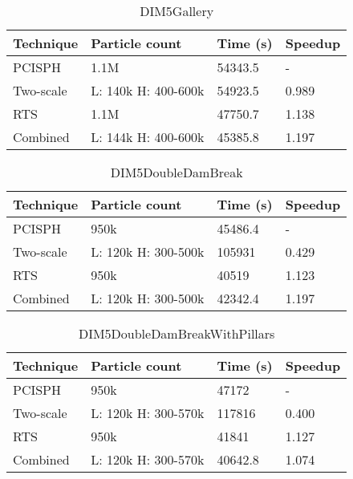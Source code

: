 \documentclass[../../main.tex]{subfiles}
\begin{document}

\begin{table}[]
\centering
\caption{DIM5Gallery}
\label{my-label}
\begin{tabular}{llll}
\hline
Technique & Particle count      & Time (s) & Speedup \\ \hline
PCISPH    & 1.1M                & 54343.5  & -       \\
Two-scale & L: 140k H: 400-600k & 54923.5  & 0.989   \\
RTS       & 1.1M                & 47750.7  & 1.138   \\
Combined  & L: 144k H: 400-600k & 45385.8  & 1.197   \\ \hline
\end{tabular}
\end{table}

\begin{table}[]
\centering
\caption{DIM5DoubleDamBreak}
\label{my-label}
\begin{tabular}{llll}
\hline
Technique & Particle count      & Time (s) & Speedup \\ \hline
PCISPH    & 950k                & 45486.4  & -       \\
Two-scale & L: 120k H: 300-500k & 105931   & 0.429   \\
RTS       & 950k                & 40519    & 1.123   \\
Combined  & L: 120k H: 300-500k & 42342.4  & 1.197   \\ \hline
\end{tabular}
\end{table}

\begin{table}[]
\centering
\caption{DIM5DoubleDamBreakWithPillars}
\label{my-label}
\begin{tabular}{llll}
\hline
Technique & Particle count      & Time (s) & Speedup \\ \hline
PCISPH    & 950k                & 47172    & -       \\
Two-scale & L: 120k H: 300-570k & 117816   & 0.400   \\
RTS       & 950k                & 41841    & 1.127   \\
Combined  & L: 120k H: 300-570k & 40642.8  & 1.074   \\ \hline
\end{tabular}
\end{table}
\end{document}
